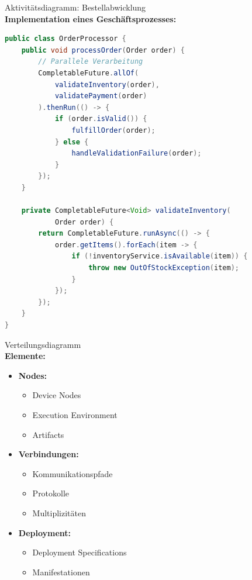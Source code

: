 \begin{example2}{Aktivitätsdiagramm: Bestellabwicklung}\\
\textbf{Implementation eines Geschäftsprozesses:}

\begin{lstlisting}[language=Java, style=basesmol]
public class OrderProcessor {
    public void processOrder(Order order) {
        // Parallele Verarbeitung
        CompletableFuture.allOf(
            validateInventory(order),
            validatePayment(order)
        ).thenRun(() -> {
            if (order.isValid()) {
                fulfillOrder(order);
            } else {
                handleValidationFailure(order);
            }
        });
    }
    
    private CompletableFuture<Void> validateInventory(
            Order order) {
        return CompletableFuture.runAsync(() -> {
            order.getItems().forEach(item -> {
                if (!inventoryService.isAvailable(item)) {
                    throw new OutOfStockException(item);
                }
            });
        });
    }
}
\end{lstlisting}
\end{example2}

\begin{definition}{Verteilungsdiagramm}\\
\textbf{Elemente:}
\begin{itemize}
    \item \textbf{Nodes:}
    \begin{itemize}
        \item Device Nodes
        \item Execution Environment
        \item Artifacts
    \end{itemize}
    
    \item \textbf{Verbindungen:}
    \begin{itemize}
        \item Kommunikationspfade
        \item Protokolle
        \item Multiplizitäten
    \end{itemize}
    
    \item \textbf{Deployment:}
    \begin{itemize}
        \item Deployment Specifications
        \item Manifestationen
    \end{itemize}
\end{itemize}
\end{definition}

